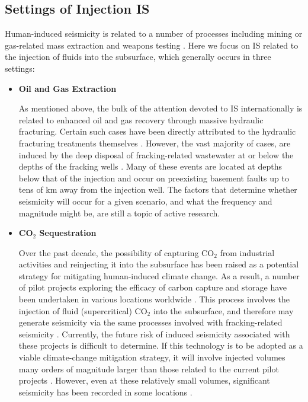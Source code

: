 \subsection{Settings of Injection IS}
Human-induced seismicity is related to a number of processes including mining or gas-related mass extraction and weapons testing \citep[e.g.][]{Chambers_2015,Kim_2007}. Here we focus on IS related to the injection of fluids into the subsurface, which generally occurs in three settings:
\begin{itemize}
  \item{\textbf{Oil and Gas Extraction}}
  
  As mentioned above, the bulk of the attention devoted to IS internationally is related to enhanced oil and gas recovery through massive hydraulic fracturing. Certain such cases have been directly attributed to the hydraulic fracturing treatments themselves \citep[e.g.][in Canada]{Atkinson_2016,Skoumal_2015}. However, the vast majority of cases, are induced by the deep disposal of fracking-related wastewater at or below the depths of the fracking wells \citep[e.g.][]{Kim_2013,Keranen_2013,Yeck_2017,McGarr_2017}. Many of these events are located at depths below that of the injection and occur on preexisting basement faults up to tens of km away from the injection well. The factors that determine whether seismicity will occur for a given scenario, and what the frequency and magnitude might be, are still a topic of active research.

  \item{\textbf{CO$_{2}$ Sequestration}}
  
  Over the past decade, the possibility of capturing CO$_2$ from industrial activities and reinjecting it into the subsurface has been raised as a potential strategy for mitigating human-induced climate change. As a result, a number of pilot projects exploring the efficacy of carbon capture and storage have been undertaken in various locations worldwide \citep{Evans_2012,Zoback_2012co2}. This process involves the injection of fluid (supercritical) CO$_2$ into the subsurface, and therefore may generate seismicity via the same processes involved with fracking-related seismicity \citep{2013}. Currently, the future risk of induced seismicity associated with these projects is difficult to determine. If this technology is to be adopted as a viable climate-change mitigation strategy, it will involve injected volumes many orders of magnitude larger than those related to the current pilot projects \citep{Zoback_2012co2}. However, even at these relatively small volumes, significant seismicity has been recorded in some locations \citep[e.g.][]{Goertz_Allmann_2017}.
  

\end{itemize}
